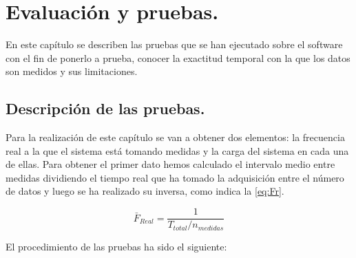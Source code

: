 \chapter{Evaluación y pruebas.}

En este capítulo se describen las pruebas que se han ejecutado sobre el software con el fin de ponerlo a prueba, conocer la exactitud temporal con la que los datos son medidos y sus limitaciones.

\section{Descripción de las pruebas.}
	Para la realización de este capítulo se van a obtener dos elementos: la frecuencia real a la que el sistema está tomando medidas y la carga del sistema en cada una de ellas. Para obtener el primer dato hemos calculado el intervalo medio entre medidas dividiendo el tiempo real que ha tomado la adquisición entre el número de datos y luego se ha realizado su inversa, como indica la \autoref{eq:Fr}.

\begin{equation}\label{eq:Fr}
	 		\bar{F}_{Real}=\dfrac{1}{T_{total}/n_{medidas}}
\end{equation}

	El procedimiento de las pruebas ha sido el siguiente:

